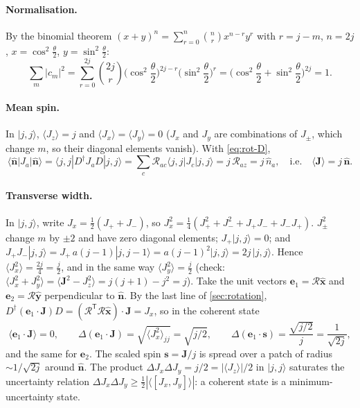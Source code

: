 \documentclass[11pt,a4paper]{article}
\newcommand{\vs}{\bm{s}}
\newcommand{\vJ}{\bm{J}}
\newcommand{\vn}{\hat{\bm n}}
\begin{document}
\paragraph{Normalisation.} By the binomial theorem $(x+y)^{n} = \sum_{r=0}^n\binom nr x^{n-r}y^r$ with $r = j-m$,
$n = 2j$, $x = \cos^2\frac\theta2$, $y = \sin^2\frac\theta2$:
\begin{equation}\label{eq:coh-norm}
  \sum_m |c_m|^2 = \sum_{r=0}^{2j}\binom{2j}{r}\Big(\cos^2\frac\theta2\Big)^{2j-r}\Big(\sin^2\frac\theta2\Big)^{r}
  = \Big(\cos^2\frac\theta2 + \sin^2\frac\theta2\Big)^{2j} = 1 .
\end{equation}

\paragraph{Mean spin.} In $|j,j\rangle$, $\langle J_z\rangle = j$ and $\langle J_x\rangle = \langle J_y\rangle = 0$
($J_x$ and $J_y$ are combinations of $J_\pm$, which change $m$, so their diagonal elements vanish). With
\eqref{eq:rot-D},
\begin{equation}\label{eq:coh-mean}
  \langle\vn|J_a|\vn\rangle = \langle j,j|D^\dagger J_aD|j,j\rangle = \sum_c\mathcal R_{ac}\langle j,j|J_c|j,j\rangle
  = j\,\mathcal R_{az} = j\,\hat n_a ,
  \quad\text{i.e.}\quad \langle\vJ\rangle = j\,\vn .
\end{equation}

\paragraph{Transverse width.} In $|j,j\rangle$, write $J_x = \frac12(J_++J_-)$, so $J_x^2 = \frac14(J_+^2 + J_-^2 +
J_+J_- + J_-J_+)$. $J_\pm^2$ change $m$ by $\pm2$ and have zero diagonal elements; $J_+|j,j\rangle = 0$; and
$J_+J_-|j,j\rangle = J_+\,a(j-1)|j,j-1\rangle = a(j-1)^2|j,j\rangle = 2j\,|j,j\rangle$. Hence $\langle J_x^2\rangle =
\frac{2j}{4} = \frac j2$, and in the same way $\langle J_y^2\rangle = \frac j2$ (check: $\langle J_x^2 + J_y^2\rangle =
\langle\vJ^2 - J_z^2\rangle = j(j+1)-j^2 = j$). Take the unit vectors $\bm e_1 = \mathcal R\hat{\bm x}$ and $\bm e_2 =
\mathcal R\hat{\bm y}$ perpendicular to $\vn$. By the last line of \cref{sec:rotation}, $D^\dagger(\bm e_1\cdot\vJ)D =
(\mathcal R^{\mathsf T}\mathcal R\hat{\bm x})\cdot\vJ = J_x$, so in the coherent state
\begin{equation}\label{eq:coh-width}
  \langle \bm e_1\cdot\vJ\rangle = 0,\qquad \Delta(\bm e_1\cdot\vJ) = \sqrt{\langle J_x^2\rangle_{jj}} = \sqrt{j/2},
  \qquad \Delta(\bm e_1\cdot\vs) = \frac{\sqrt{j/2}}{j} = \frac{1}{\sqrt{2j}} ,
\end{equation}
and the same for $\bm e_2$. The scaled spin $\vs = \vJ/j$ is spread over a patch of radius $\sim 1/\sqrt{2j}$ around
$\vn$. The product $\Delta J_x\Delta J_y = j/2 = |\langle J_z\rangle|/2$ in $|j,j\rangle$ saturates the uncertainty
relation $\Delta J_x\Delta J_y\ge\frac12|\langle[J_x,J_y]\rangle|$: a coherent state is a minimum-uncertainty state.
\end{document}
